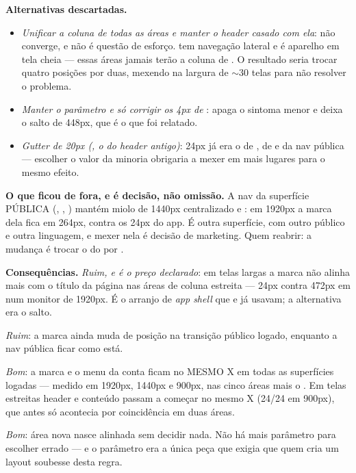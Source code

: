\textbf{Alternativas descartadas.}
\begin{itemize}
  \item \emph{Unificar a coluna de todas as áreas e manter o header casado com
    ela}: não converge, e não é questão de esforço.  tem navegação
    lateral e  é aparelho em tela cheia --- essas áreas jamais terão a
    coluna de . O resultado seria trocar quatro posições por
    duas, mexendo na largura de $\sim$30 telas para não resolver o problema.
  \item \emph{Manter o parâmetro e só corrigir os 4px de }: apaga o
    sintoma menor e deixa o salto de 448px, que é o que foi relatado.
  \item \emph{Gutter de 20px (, o do header antigo)}: 24px já era o de
    , de  e da nav pública --- escolher o valor da
    minoria obrigaria a mexer em mais lugares para o mesmo efeito.
\end{itemize}

\textbf{O que ficou de fora, e é decisão, não omissão.} A nav da superfície
PÚBLICA (\cd{/}, , ) mantém miolo de 1440px
centralizado e : em 1920px a marca dela fica em 264px, contra
os 24px do app. É outra superfície, com outro público e outra linguagem, e mexer
nela é decisão de marketing. Quem reabrir: a mudança é trocar o  do
 por .

\textbf{Consequências.} \emph{Ruim, e é o preço declarado}: em telas largas a
marca não alinha mais com o título da página nas áreas de coluna estreita ---
24px contra 472px em  num monitor de 1920px. É o arranjo de
\emph{app shell} que  e  já usavam; a alternativa era o
salto.

\emph{Ruim}: a marca ainda muda de posição na transição público \seta{} logado,
enquanto a nav pública ficar como está.

\emph{Bom}: a marca e o menu da conta ficam no MESMO X em todas as superfícies
logadas --- medido em 1920px, 1440px e 900px, nas cinco áreas mais o
. Em telas estreitas header e conteúdo passam a começar no mesmo
X (24/24 em 900px), que antes só acontecia por coincidência em duas áreas.

\emph{Bom}: área nova nasce alinhada sem decidir nada. Não há mais parâmetro para
escolher errado --- e o parâmetro era a única peça que exigia que quem cria um
layout soubesse desta regra.

